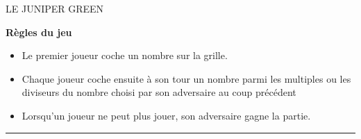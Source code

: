 \documentclass[activite]{thedocument}
\begin{document}
\begin{center}
    \LARGE LE JUNIPER GREEN
\end{center}
\vskip20pt
{\bfseries\Large Règles du jeu}
\begin{itemize}
    \item Le premier joueur coche un nombre sur la grille.
    \item Chaque joueur coche ensuite à son tour un nombre parmi les
    multiples ou les diviseurs du nombre choisi par son adversaire au
    coup précédent
    \item Lorsqu'un joueur ne peut plus jouer, son adversaire gagne la partie.
\end{itemize}
\vskip20pt
{\centering
{}\par}
\rule{\linewidth}{1pt}\vskip10pt
{\centering
{}\par}
\end{document}
